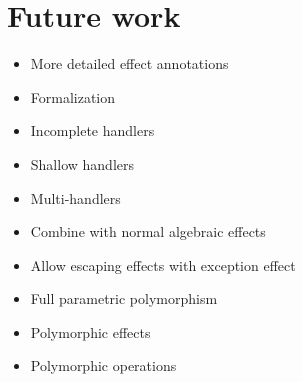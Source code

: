 \section{Future work}

\begin{itemize}
\item More detailed effect annotations
\item Formalization
\item Incomplete handlers
\item Shallow handlers
\item Multi-handlers
\item Combine with normal algebraic effects
\item Allow escaping effects with exception effect
\item Full parametric polymorphism
\item Polymorphic effects
\item Polymorphic operations
\end{itemize}
